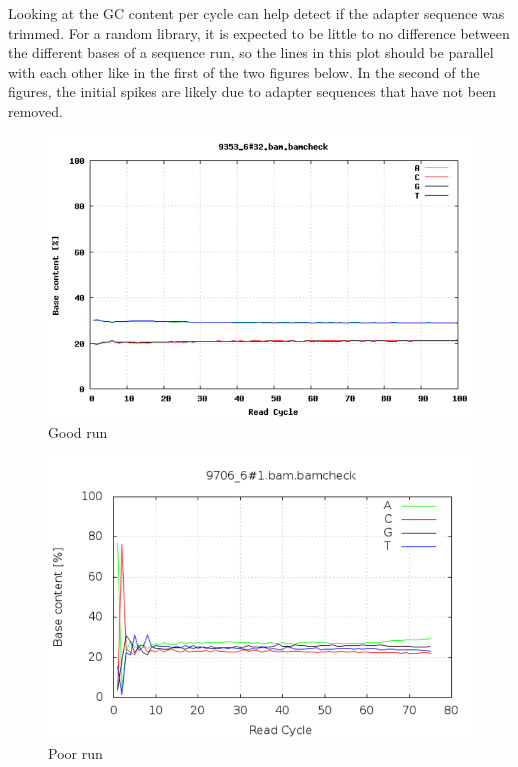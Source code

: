 \documentclass[11pt]{article}
\makeatletter
\def\maxwidth{\ifdim\Gin@nat@width>\linewidth\linewidth
    \else\Gin@nat@width\fi}
\let\Oldincludegraphics\includegraphics
\renewcommand{\includegraphics}[1]{\Oldincludegraphics[width=.8\maxwidth, height=.55\textheight, keepaspectratio]{#1}}
\makeatother
\begin{document}
Looking at the GC content per cycle can help detect if the adapter
sequence was trimmed. For a random library, it is expected to be little
to no difference between the different bases of a sequence run, so the
lines in this plot should be parallel with each other like in the first
of the two figures below. In the second of the figures, the initial
spikes are likely due to adapter sequences that have not been removed.

    \begin{figure}[H]
\centering
\includegraphics{img/acgt_per_cycle_pass.png}
\caption{Good run}
\end{figure}

    \begin{figure}[H]
\centering
\includegraphics{img/acgt_per_cycle_fail.png}
\caption{Poor run}
\end{figure}
\end{document}
